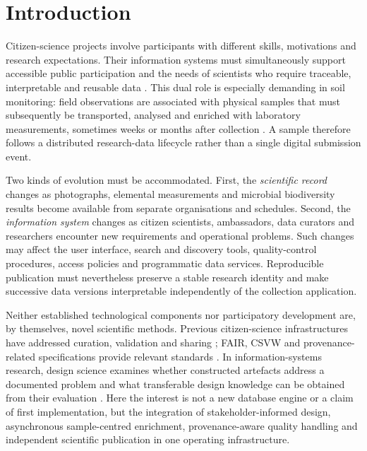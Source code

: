 \documentclass[11pt,a4paper]{article}
\begin{document}
\section{Introduction}
Citizen-science projects involve participants with different skills, motivations and research expectations. Their information systems must simultaneously support accessible public participation and the needs of scientists who require traceable, interpretable and reusable data \parencite{bonney2009citizenscience,bonney2014nextsteps}. This dual role is especially demanding in soil monitoring: field observations are associated with physical samples that must subsequently be transported, analysed and enriched with laboratory measurements, sometimes weeks or months after collection \parencite{peiro2026soil}. A sample therefore follows a distributed research-data lifecycle rather than a single digital submission event.

Two kinds of evolution must be accommodated. First, the \emph{scientific record} changes as photographs, elemental measurements and microbial biodiversity results become available from separate organisations and schedules. Second, the \emph{information system} changes as citizen scientists, ambassadors, data curators and researchers encounter new requirements and operational problems. Such changes may affect the user interface, search and discovery tools, quality-control procedures, access policies and programmatic data services. Reproducible publication must nevertheless preserve a stable research identity and make successive data versions interpretable independently of the collection application.

Neither established technological components nor participatory development are, by themselves, novel scientific methods. Previous citizen-science infrastructures have addressed curation, validation and sharing \parencite{wang2015citsci,sullivan2014ebird}; FAIR, CSVW and provenance-related specifications provide relevant standards \parencite{wilkinson2016fair,w3c2015csvw,w3c2013provo,soiland2022rocrate}. In information-systems research, design science examines whether constructed artefacts address a documented problem and what transferable design knowledge can be obtained from their evaluation \parencite{hevner2004design,peffers2007dsrm}. Here the interest is not a new database engine or a claim of first implementation, but the integration of stakeholder-informed design, asynchronous sample-centred enrichment, provenance-aware quality handling and independent scientific publication in one operating infrastructure.
\end{document}
